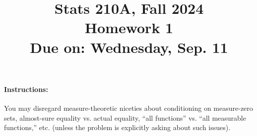\documentclass{article}
\theoremstyle{definition}
\begin{document}
\title{Stats 210A, Fall 2024\\
  Homework 1\\
  {\large {\bf Due on}: Wednesday, Sep. 11}}
\date{}

\maketitle

\paragraph{Instructions:} You may disregard measure-theoretic niceties about conditioning on measure-zero sets, almost-sure equality vs. actual equality, ``all functions'' vs. ``all measurable functions,'' etc. (unless the problem is explicitly asking about such issues).
\end{document}
